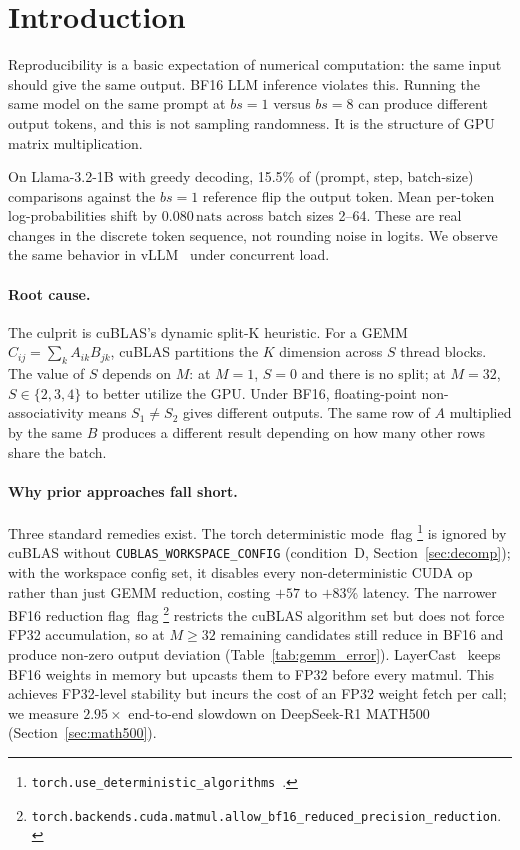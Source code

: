 \documentclass{article}
\newcommand{\nats}{\,\text{nats}\xspace}
\newcommand{\bfflag}{BF16 reduction flag\xspace}
\newcommand{\detflag}{torch deterministic mode\xspace}
\begin{document}
\section{Introduction}
\label{sec:intro}

Reproducibility is a basic expectation of numerical computation: the same input
should give the same output. BF16 LLM inference violates this. Running the same
model on the same prompt at $bs\!=\!1$ versus $bs\!=\!8$ can produce different
output tokens, and this is not sampling randomness. It is the structure of GPU
matrix multiplication.

On Llama-3.2-1B with greedy decoding, 15.5\% of (prompt, step, batch-size)
comparisons against the $bs\!=\!1$ reference flip the output token. Mean per-token
log-probabilities shift by $0.080\nats$ across batch sizes 2--64. These are real
changes in the discrete token sequence, not rounding noise in logits. We observe
the same behavior in vLLM~\citep{kwon2023vllm} under concurrent load.

\paragraph{Root cause.}
The culprit is cuBLAS's dynamic split-K heuristic. For a GEMM $C_{ij}=\sum_k
A_{ik}B_{jk}$, cuBLAS partitions the $K$ dimension across $S$ thread blocks. The
value of $S$ depends on $M$: at $M\!=\!1$, $S\!=\!0$ and there is no split; at
$M\!=\!32$, $S\!\in\!\{2,3,4\}$ to better utilize the GPU. Under BF16,
floating-point non-associativity means $S_1\ne S_2$ gives different outputs. The
same row of $A$ multiplied by the same $B$ produces a different result depending
on how many other rows share the batch.

\paragraph{Why prior approaches fall short.}
Three standard remedies exist. The \detflag\ flag%
\footnote{\texttt{torch.use\_deterministic\_algorithms}~\citep{pytorch2024det}.}
is ignored by cuBLAS without \texttt{CUBLAS\_WORKSPACE\_CONFIG} (condition~D,
Section~\ref{sec:decomp}); with the workspace config set, it disables every
non-deterministic CUDA op rather than just GEMM reduction, costing $+57$ to
$+83\%$ latency. The narrower \bfflag\ flag%
\footnote{\texttt{torch.backends.cuda.matmul.allow\_bf16\_reduced\_precision\_reduction}.}
restricts the cuBLAS algorithm set but does not force FP32 accumulation, so at
$M\!\ge\!32$ remaining candidates still reduce in BF16 and produce non-zero
output deviation (Table~\ref{tab:gemm_error}). LayerCast~\citep{yuan2025numerical}
keeps BF16 weights in memory but upcasts them to FP32 before every matmul.
This achieves FP32-level stability but incurs the cost of an FP32 weight
fetch per call; we measure $2.95\times$ end-to-end slowdown on DeepSeek-R1
MATH500 (Section~\ref{sec:math500}).
\end{document}
